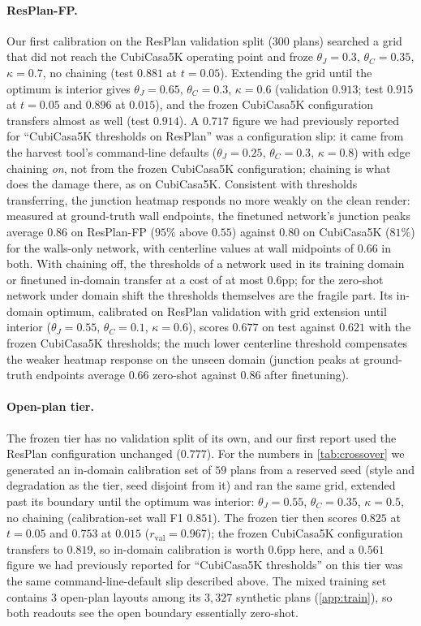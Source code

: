 \documentclass{article}
\begin{document}
\paragraph{ResPlan-FP.} Our first calibration on the ResPlan validation
split ($300$ plans) searched a grid that did not reach the CubiCasa5K operating
point and froze $\theta_J=0.3$, $\theta_C=0.35$, $\kappa=0.7$, no chaining
(test $0.881$ at $t=0.05$). Extending the grid until the optimum is interior
gives $\theta_J=0.65$, $\theta_C=0.3$, $\kappa=0.6$ (validation $0.913$;
test $0.915$ at $t=0.05$ and $0.896$ at $0.015$), and the frozen CubiCasa5K
configuration transfers almost as well (test $0.914$). A $0.717$ figure we
had previously reported for ``CubiCasa5K thresholds on ResPlan'' was a
configuration slip: it came from the harvest tool's command-line defaults
($\theta_J=0.25$, $\theta_C=0.3$, $\kappa=0.8$) with edge chaining
\emph{on}, not from the frozen CubiCasa5K configuration; chaining is what does the
damage there, as on CubiCasa5K. Consistent with thresholds transferring, the
junction heatmap responds no more weakly on the clean render: measured at
ground-truth wall endpoints, the finetuned network's junction peaks average
$0.86$ on ResPlan-FP ($95\%$ above $0.55$) against $0.80$ on CubiCasa5K
($81\%$) for the walls-only network, with centerline values at wall midpoints
of $0.66$ in both. With chaining off, the thresholds of a network used in its training domain
or finetuned in-domain transfer at a cost of at most $0.6$pp; for the
zero-shot network under domain shift the thresholds themselves are the
fragile part. Its in-domain optimum, calibrated on ResPlan validation with
grid extension until interior ($\theta_J=0.55$, $\theta_C=0.1$,
$\kappa=0.6$), scores $0.677$ on test against $0.621$ with the frozen CubiCasa5K
thresholds; the much lower centerline threshold compensates the weaker
heatmap response on the unseen domain (junction peaks at ground-truth
endpoints average $0.66$ zero-shot against $0.86$ after finetuning).

\paragraph{Open-plan tier.} The frozen tier has no validation split of its
own, and our first report used the ResPlan configuration unchanged ($0.777$). For the numbers in
\cref{tab:crossover} we generated an in-domain calibration set of $59$ plans
from a reserved seed (style and degradation as the tier, seed disjoint from
it) and ran the same grid, extended past its boundary until the optimum was
interior: $\theta_J=0.55$, $\theta_C=0.35$, $\kappa=0.5$, no chaining
(calibration-set wall F1 $0.851$). The frozen tier then scores $0.825$ at
$t=0.05$ and $0.753$ at $0.015$ ($r_{\mathrm{val}}=0.967$); the frozen
CubiCasa5K configuration transfers to $0.819$, so in-domain calibration is
worth $0.6$pp here, and a $0.561$ figure we had previously reported for
``CubiCasa5K thresholds'' on this tier was the same command-line-default slip
described above.
The mixed training set contains $3$ open-plan layouts among its $3{,}327$
synthetic plans (\cref{app:train}), so both readouts see the open boundary
essentially zero-shot.
\end{document}
